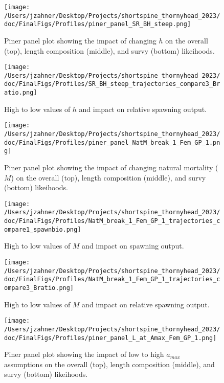 \documentclass[11pt,
  english,
  letterpaper,
]{article}
\begin{document}
\begin{figure}
\centering
\texttt{[image: /Users/jzahner/Desktop/Projects/shortspine\_thornyhead\_2023/doc/FinalFigs/Profiles/piner\_panel\_SR\_BH\_steep.png]}
\caption{Piner panel plot showing the impact of changing \(h\) on the overall (top), length composition (middle), and survy (bottom) likeihoods.\label{fig:h_piner_prof}}
\end{figure}

\begin{figure}
\centering
\texttt{[image: /Users/jzahner/Desktop/Projects/shortspine\_thornyhead\_2023/doc/FinalFigs/Profiles/SR\_BH\_steep\_trajectories\_compare3\_Bratio.png]}
\caption{High to low values of \(h\) and impact on relative spawning output.\label{fig:h_spawnout}}
\end{figure}

\begin{figure}
\centering
\texttt{[image: /Users/jzahner/Desktop/Projects/shortspine\_thornyhead\_2023/doc/FinalFigs/Profiles/piner\_panel\_NatM\_break\_1\_Fem\_GP\_1.png]}
\caption{Piner panel plot showing the impact of changing natural mortality (\(M\)) on the overall (top), length composition (middle), and survy (bottom) likeihoods.\label{fig:M_prof}}
\end{figure}

\begin{figure}
\centering
\texttt{[image: /Users/jzahner/Desktop/Projects/shortspine\_thornyhead\_2023/doc/FinalFigs/Profiles/NatM\_break\_1\_Fem\_GP\_1\_trajectories\_compare1\_spawnbio.png]}
\caption{High to low values of \(M\) and impact on spawning output.\label{fig:M_spawnout}}
\end{figure}

\begin{figure}
\centering
\texttt{[image: /Users/jzahner/Desktop/Projects/shortspine\_thornyhead\_2023/doc/FinalFigs/Profiles/NatM\_break\_1\_Fem\_GP\_1\_trajectories\_compare3\_Bratio.png]}
\caption{High to low values of \(M\) and impact on relative spawning output.\label{fig:M_relspawnout}}
\end{figure}

\begin{figure}
\centering
\texttt{[image: /Users/jzahner/Desktop/Projects/shortspine\_thornyhead\_2023/doc/FinalFigs/Profiles/piner\_panel\_L\_at\_Amax\_Fem\_GP\_1.png]}
\caption{Piner panel plot showing the impact of low to high \(a_{max}\) assumptions on the overall (top), length composition (middle), and survy (bottom) likeihoods.\label{fig:growth_prof}}
\end{figure}
\end{document}
